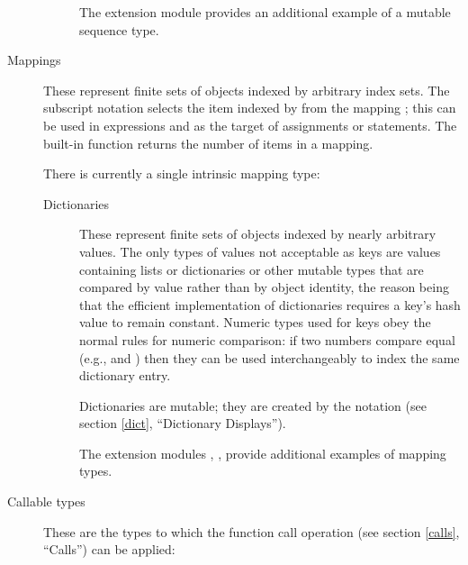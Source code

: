 \begin{description}
\begin{description}
\begin{description}
\end{description} %

The extension module  provides an
additional example of a mutable sequence type.


\end{description} %

\item[Mappings]
These represent finite sets of objects indexed by arbitrary index sets.
The subscript notation  selects the item indexed
by  from the mapping ; this can be used in
expressions and as the target of assignments or  statements.
The built-in function  returns the number of items
in a mapping.

There is currently a single intrinsic mapping type:

\begin{description}

\item[Dictionaries]
These represent finite sets of objects indexed by
nearly arbitrary values.  The only types of values not acceptable as
keys are values containing lists or dictionaries or other mutable
types that are compared by value rather than by object identity, the
reason being that the efficient implementation of dictionaries
requires a key's hash value to remain constant.
Numeric types used for keys obey the normal rules for numeric
comparison: if two numbers compare equal (e.g.,  and
) then they can be used interchangeably to index the same
dictionary entry.

Dictionaries are mutable; they are created by the
 notation (see section \ref{dict}, ``Dictionary
Displays'').

The extension modules ,
, 
provide additional examples of mapping types.

\end{description} %

\item[Callable types]
These are the types to which the function call
operation (see section \ref{calls}, ``Calls'') can be applied:

\begin{description}


\end{description}
\end{description}
